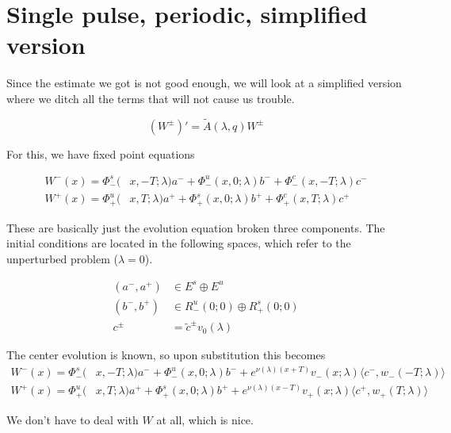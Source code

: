 \documentclass[12pt]{article}
\begin{document}
\section*{Single pulse, periodic, simplified version}

Since the estimate we got is not good enough, we will look at a simplified version where we ditch all the terms that will not cause us trouble. 

\[
(W^\pm)' = \tilde{A}(\lambda, q) W^\pm
\]

For this, we have fixed point equations

\begin{align*}
W^-(x) = \Phi^s_-(&x, -T; \lambda)a^- + \Phi^u_-(x, 0; \lambda)b^- + \Phi^c_-(x, -T; \lambda)c^- \\
W^+(x) = \Phi^u_+(&x, T; \lambda)a^+ + \Phi^s_+(x, 0; \lambda)b^+ + \Phi^c_+(x, T; \lambda)c^+ 
\end{align*}

These are basically just the evolution equation broken three components. The initial conditions are located in the following spaces, which refer to the unperturbed problem ($\lambda = 0$).

\begin{align*}
(a^-, a^+) &\in E^s \oplus E^u\\
(b^-, b^+) &\in R^u_-(0; 0) \oplus R^s_+(0; 0)\\
c^\pm &= \tilde{c}^\pm v_0(\lambda)
\end{align*}

The center evolution is known, so upon substitution this becomes
\begin{align*}
W^-(x) = \Phi^s_-(&x, -T; \lambda)a^- + \Phi^u_-(x, 0; \lambda)b^- + e^{\nu(\lambda)(x+T)} v_-(x; \lambda) \langle c^-, w_-(-T; \lambda) \rangle \\
W^+(x) = \Phi^u_+(&x, T; \lambda)a^+ + \Phi^s_+(x, 0; \lambda)b^+ + e^{\nu(\lambda)(x - T)} v_+(x; \lambda) \langle c^+, w_+(T; \lambda) \rangle 
\end{align*}

We don't have to deal with $W$ at all, which is nice. 
\end{document}
